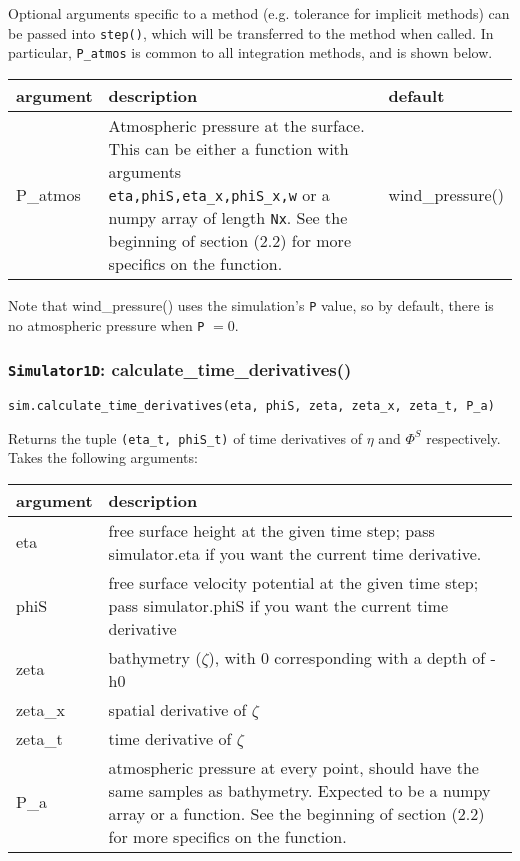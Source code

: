 \documentclass[10pt,a4paper]{article}
\newenvironment{arglist}
    {\begin{center}
    \begin{tabular}{l|p{12cm}}
    argument & description\\
    \hline
    }
    { 
    \end{tabular} 
    \end{center}
    }
\newenvironment{optarglist}
    {\begin{center}
    \begin{tabular}{l|p{10cm}|l}
    argument & description & default\\
    \hline
    }
    { 
    \end{tabular} 
    \end{center}
    }
\begin{document}
Optional arguments specific to a method (e.g. tolerance for implicit methods) can be passed into \texttt{step()}, which will be transferred to the method when called. In particular, \texttt{P\_atmos} is common to all integration methods, and is shown below.

\begin{optarglist}
P\_atmos & Atmospheric pressure at the surface. This can be either a function with arguments \texttt{eta,phiS,eta\_x,phiS\_x,w} or a numpy array of length \texttt{Nx}. See the beginning of section (2.2) for more specifics on the function. & wind\_pressure()
\end{optarglist}

Note that wind\_pressure() uses the simulation's \texttt{P} value, so by default, there is no atmospheric pressure when \texttt{P} $ = 0$.



\subsubsection{\texttt{Simulator1D}: calculate\_time\_derivatives()}
\texttt{sim.calculate\_time\_derivatives(eta, phiS, zeta, zeta\_x, zeta\_t, P\_a)}

Returns the tuple \texttt{(eta\_t, phiS\_t)} of time derivatives of $\eta$ and $\Phi^S$ respectively. Takes the following arguments:

\begin{arglist}
eta      & free surface height at the given time step; pass
                    simulator.eta if you want the current time derivative.\\\hline
        phiS     & free surface velocity potential at the given time step;
                    pass simulator.phiS if you want the current time derivative\\\hline
        zeta     & bathymetry ($\zeta$), with 0 corresponding with a depth of -h0\\\hline
        zeta\_x   & spatial derivative of $\zeta$\\\hline
        zeta\_t   & time derivative of $\zeta$\\\hline
        P\_a      & atmospheric pressure at every point, should have the
                    same samples as bathymetry. Expected to be a numpy
                    array or a function. See the beginning of section (2.2) for more specifics on the function.
\end{arglist}
\end{document}
